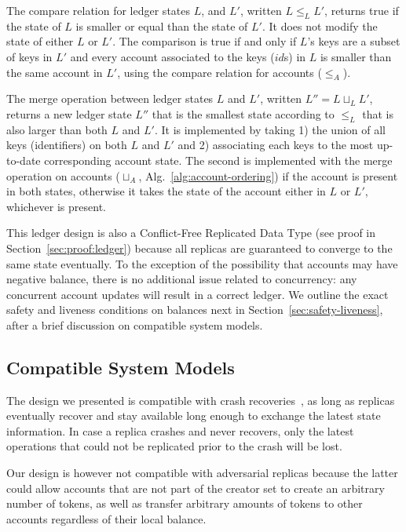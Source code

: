 \documentclass[9pt]{article}   	%
\begin{document}
The compare relation for ledger states $L$, and $L'$, written $L \leq_L L'$, returns true if the state of $L$ is smaller or equal than the state of $L'$. It does not modify the state of either $L$ or $L'$. The comparison is true if and only if $L$'s keys are a subset of keys in $L'$ and every account associated to the keys ($id$s) in $L$ is smaller than the same account in $L'$, using the compare relation for accounts ($\leq_A$).

The merge operation between ledger states $L$ and $L'$, written $L'' = L \sqcup_L L'$, returns a new ledger state $L''$ that is the smallest state according to $\leq_L$ that is also larger than both $L$ and $L'$. It is implemented by taking 1) the union of all keys (identifiers) on both $L$ and $L'$ and 2) associating each keys to the most up-to-date corresponding account state. The second is implemented with the merge operation on accounts ($\sqcup_A$, Alg.~\ref{alg:account-ordering}) if the account is present in both states, otherwise it takes the state of the account either in $L$ or $L'$, whichever is present.


This ledger design is also a Conflict-Free Replicated Data Type (see proof in Section~\ref{sec:proof:ledger}) because all replicas are guaranteed to converge to the same state eventually. To the exception of the possibility that accounts may have negative balance, there is no additional issue related to concurrency: any concurrent account updates will result in a correct ledger. We outline the exact safety and liveness conditions on balances next in Section~\ref{sec:safety-liveness}, after a brief discussion on compatible system models.

\subsection{Compatible System Models}

The design we presented is compatible with crash recoveries~\cite{cachin2011introduction}, as long as replicas eventually recover and stay available long enough to exchange the latest state information. In case a replica crashes and never recovers, only the latest operations that could not be replicated prior to the crash will be lost. 

Our design is however not compatible with adversarial replicas because the latter could allow accounts that are not part of the creator set to create an arbitrary number of tokens, as well as transfer arbitrary amounts of tokens to other accounts regardless of their local balance. 
\end{document}
